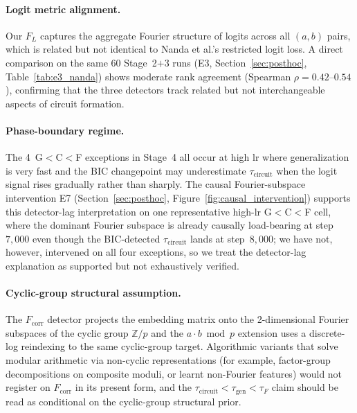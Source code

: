\documentclass{article}
\newcommand{\taug}{\tau_{\mathrm{gen}}}
\newcommand{\tauf}{\tau_{F}}
\newcommand{\taucirc}{\tau_{\mathrm{circuit}}}
\newcommand{\fcorr}{F_{\mathrm{corr}}}
\newcommand{\flogit}{F_{L}}
\begin{document}
\paragraph{Logit metric alignment.}
Our $\flogit$ captures the aggregate Fourier structure of logits
across all $(a,b)$ pairs, which is related but not identical to
Nanda et al.'s restricted logit loss.
A direct comparison on the same 60 Stage~2$+$3 runs (E3,
Section~\ref{sec:posthoc}, Table~\ref{tab:e3_nanda}) shows
moderate rank agreement (Spearman $\rho{=}0.42$--$0.54$),
confirming that the three detectors track related but not
interchangeable aspects of circuit formation.

\paragraph{Phase-boundary regime.}
The 4~G$<$C$<$F exceptions in Stage~4 all occur at high lr
where generalization is very fast and the BIC changepoint may
underestimate $\taucirc$ when the logit signal rises gradually
rather than sharply.
The causal Fourier-subspace intervention E7
(Section~\ref{sec:posthoc}, Figure~\ref{fig:causal_intervention})
supports this detector-lag interpretation on one representative
high-lr G$<$C$<$F cell, where the dominant Fourier subspace is
already causally load-bearing at step~$7{,}000$ even though the
BIC-detected $\taucirc$ lands at step~$8{,}000$;
we have not, however, intervened on all four exceptions, so we
treat the detector-lag explanation as supported but not
exhaustively verified.

\paragraph{Cyclic-group structural assumption.}
The $\fcorr$ detector projects the embedding matrix onto the
2-dimensional Fourier subspaces of the cyclic group $\mathbb{Z}/p$
and the $a\cdot b\bmod p$ extension uses a discrete-log reindexing
to the same cyclic-group target.
Algorithmic variants that solve modular arithmetic via non-cyclic
representations (for example, factor-group decompositions on
composite moduli, or learnt non-Fourier features) would not
register on $\fcorr$ in its present form, and the
$\taucirc<\taug<\tauf$ claim should be read as conditional on the
cyclic-group structural prior.
\end{document}
